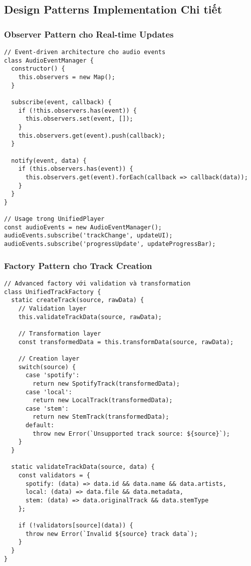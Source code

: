 \documentclass[12pt,a4paper]{article}
\begin{document}
\subsection{Design Patterns Implementation Chi tiết}

\subsubsection{Observer Pattern cho Real-time Updates}

\begin{lstlisting}[caption={Event-driven architecture cho audio events}]
// Event-driven architecture cho audio events
class AudioEventManager {
  constructor() {
    this.observers = new Map();
  }
  
  subscribe(event, callback) {
    if (!this.observers.has(event)) {
      this.observers.set(event, []);
    }
    this.observers.get(event).push(callback);
  }
  
  notify(event, data) {
    if (this.observers.has(event)) {
      this.observers.get(event).forEach(callback => callback(data));
    }
  }
}

// Usage trong UnifiedPlayer
const audioEvents = new AudioEventManager();
audioEvents.subscribe('trackChange', updateUI);
audioEvents.subscribe('progressUpdate', updateProgressBar);
\end{lstlisting}

\subsubsection{Factory Pattern cho Track Creation}

\begin{lstlisting}[caption={Advanced factory với validation và transformation}]
// Advanced factory với validation và transformation
class UnifiedTrackFactory {
  static createTrack(source, rawData) {
    // Validation layer
    this.validateTrackData(source, rawData);
    
    // Transformation layer
    const transformedData = this.transformData(source, rawData);
    
    // Creation layer
    switch(source) {
      case 'spotify':
        return new SpotifyTrack(transformedData);
      case 'local':
        return new LocalTrack(transformedData);
      case 'stem':
        return new StemTrack(transformedData);
      default:
        throw new Error(`Unsupported track source: ${source}`);
    }
  }
  
  static validateTrackData(source, data) {
    const validators = {
      spotify: (data) => data.id && data.name && data.artists,
      local: (data) => data.file && data.metadata,
      stem: (data) => data.originalTrack && data.stemType
    };
    
    if (!validators[source](data)) {
      throw new Error(`Invalid ${source} track data`);
    }
  }
}
\end{lstlisting}
\end{document}
